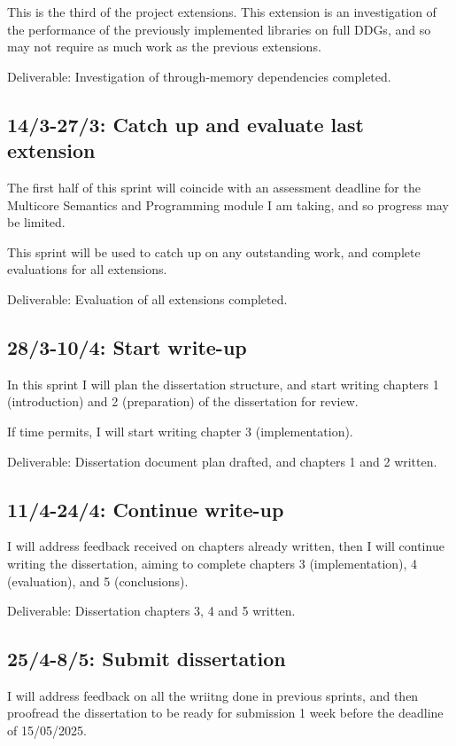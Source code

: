\documentclass[a4paper,12pt]{article}
\begin{document}
This is the third of the project extensions.
This extension is an investigation of the performance of the previously implemented
libraries on full DDGs, and so may not require as much work as the previous extensions.

\medskip\noindent Deliverable: Investigation of through-memory dependencies completed.

\subsection*{14/3-27/3: Catch up and evaluate last extension}
The first half of this sprint will coincide with an assessment deadline for the Multicore
Semantics and Programming module I am taking, and so progress may be limited.

This sprint will be used to catch up on any outstanding work, and complete evaluations for all
extensions.

\medskip\noindent Deliverable: Evaluation of all extensions completed.

\subsection*{28/3-10/4: Start write-up}
In this sprint I will plan the dissertation structure, and start writing
chapters 1 (introduction) and 2 (preparation) of the dissertation for review.

If time permits, I will start writing chapter 3 (implementation).

\medskip\noindent Deliverable: Dissertation document plan drafted, and chapters 1 and 2 written.

\subsection*{11/4-24/4: Continue write-up}
I will address feedback received on chapters already written, then I will
continue writing the dissertation, aiming to complete chapters 3 (implementation),
4 (evaluation), and 5 (conclusions).

\medskip\noindent Deliverable: Dissertation chapters 3, 4 and 5 written.

\subsection*{25/4-8/5: Submit dissertation}
I will address feedback on all the wriitng done in previous sprints, and then
proofread the dissertation to be ready for submission 1 week before the deadline of
15/05/2025.
\end{document}
